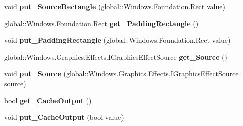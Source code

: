 \begin{DoxyCompactItemize}
\item 
\mbox{\label{class_microsoft_1_1_graphics_1_1_canvas_1_1_effects_1_1_atlas_effect_a5b0831a587ccba8f8446c7c800898567}} 
void {\bfseries put\+\_\+\+Source\+Rectangle} (global\+::\+Windows.\+Foundation.\+Rect value)
\item 
\mbox{\label{class_microsoft_1_1_graphics_1_1_canvas_1_1_effects_1_1_atlas_effect_a7e457bab07ec38167bce72c522e34743}} 
global\+::\+Windows.\+Foundation.\+Rect {\bfseries get\+\_\+\+Padding\+Rectangle} ()
\item 
\mbox{\label{class_microsoft_1_1_graphics_1_1_canvas_1_1_effects_1_1_atlas_effect_ab39b71d277811975989494c96fa44eb8}} 
void {\bfseries put\+\_\+\+Padding\+Rectangle} (global\+::\+Windows.\+Foundation.\+Rect value)
\item 
\mbox{\label{class_microsoft_1_1_graphics_1_1_canvas_1_1_effects_1_1_atlas_effect_a137fc0dfdd8f3bd7fa836c902912ad7b}} 
global\+::\+Windows.\+Graphics.\+Effects.\+I\+Graphics\+Effect\+Source {\bfseries get\+\_\+\+Source} ()
\item 
\mbox{\label{class_microsoft_1_1_graphics_1_1_canvas_1_1_effects_1_1_atlas_effect_a5f26925a5df1c7cc2cebea7c7f995d8d}} 
void {\bfseries put\+\_\+\+Source} (global\+::\+Windows.\+Graphics.\+Effects.\+I\+Graphics\+Effect\+Source source)
\item 
\mbox{\label{class_microsoft_1_1_graphics_1_1_canvas_1_1_effects_1_1_atlas_effect_ae6ee5415891e9ad47abc270643df5d9c}} 
bool {\bfseries get\+\_\+\+Cache\+Output} ()
\item 
\mbox{\label{class_microsoft_1_1_graphics_1_1_canvas_1_1_effects_1_1_atlas_effect_a2ce99657e3acfc9ac4fe666ac5f45d3a}} 
void {\bfseries put\+\_\+\+Cache\+Output} (bool value)
\item 

\end{DoxyCompactItemize}
